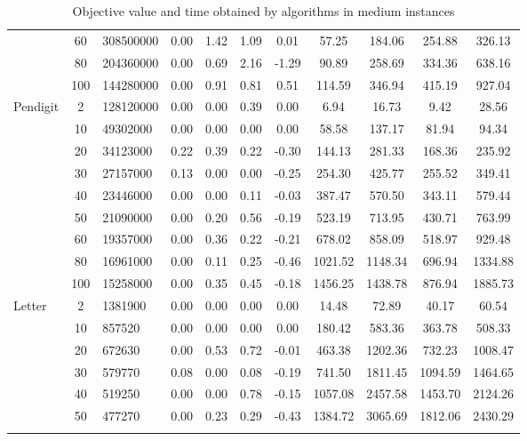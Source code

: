 {\begin{longtable}{@{}lclcccccccc@{}}
             & 60  & 308500000     & 0.00    & 1.42 & 1.09 & 0.01  & 57.25   & 184.06  & 254.88  & 326.13  \\
             & 80  & 204360000     & 0.00    & 0.69 & 2.16 & -1.29 & 90.89   & 258.69  & 334.36  & 638.16  \\
             & 100 & 144280000     & 0.00    & 0.91 & 0.81 & 0.51  & 114.59  & 346.94  & 415.19  & 927.04  \\ \hline
Pendigit     & 2   & 128120000     & 0.00    & 0.00 & 0.39 & 0.00  & 6.94    & 16.73   & 9.42    & 28.56   \\
             & 10  & 49302000      & 0.00    & 0.00 & 0.00 & 0.00  & 58.58   & 137.17  & 81.94   & 94.34   \\
             & 20  & 34123000      & 0.22    & 0.39 & 0.22 & -0.30 & 144.13  & 281.33  & 168.36  & 235.92  \\
             & 30  & 27157000      & 0.13    & 0.00 & 0.00 & -0.25 & 254.30  & 425.77  & 255.52  & 349.41  \\
             & 40  & 23446000      & 0.00    & 0.00 & 0.11 & -0.03 & 387.47  & 570.50  & 343.11  & 579.44  \\
             & 50  & 21090000      & 0.00    & 0.20 & 0.56 & -0.19 & 523.19  & 713.95  & 430.71  & 763.99  \\
             & 60  & 19357000      & 0.00    & 0.36 & 0.22 & -0.21 & 678.02  & 858.09  & 518.97  & 929.48  \\
             & 80  & 16961000      & 0.00    & 0.11 & 0.25 & -0.46 & 1021.52 & 1148.34 & 696.94  & 1334.88 \\
             & 100 & 15258000      & 0.00    & 0.35 & 0.45 & -0.18 & 1456.25 & 1438.78 & 876.94  & 1885.73 \\ \hline
Letter       & 2   & 1381900       & 0.00    & 0.00 & 0.00 & 0.00  & 14.48   & 72.89   & 40.17   & 60.54   \\
             & 10  & 857520        & 0.00    & 0.00 & 0.00 & 0.00  & 180.42  & 583.36  & 363.78  & 508.33  \\
             & 20  & 672630        & 0.00    & 0.53 & 0.72 & -0.01 & 463.38  & 1202.36 & 732.23  & 1008.47 \\
             & 30  & 579770        & 0.08    & 0.00 & 0.08 & -0.19 & 741.50  & 1811.45 & 1094.59 & 1464.65 \\
             & 40  & 519250        & 0.00    & 0.00 & 0.78 & -0.15 & 1057.08 & 2457.58 & 1453.70 & 2124.26 \\
             & 50  & 477270        & 0.00    & 0.23 & 0.29 & -0.43 & 1384.72 & 3065.69 & 1812.06 & 2430.29 \\ \bottomrule
\caption{Objective value and time obtained by algorithms in medium instances}
\end{longtable}}
\label{results-all-B}